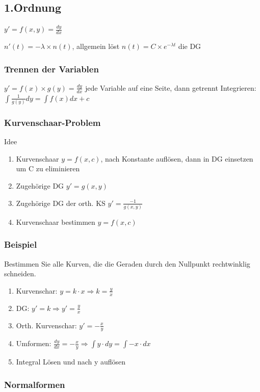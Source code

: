 \subsection*{1.Ordnung}

$y'=f(x,y)=\frac{dy}{dx}$

$n'(t)=-\lambda\times n(t)$, allgemein löst $n(t)=C\times e^{-\lambda t}$
die DG


\subsubsection*{Trennen der Variablen}

$y'=f(x)\times g(y)=\frac{dy}{dx}$ jede Variable auf eine Seite,
dann getrennt Integrieren: $\int\frac{1}{g(y)}dy=\int f(x)dx+c$ 


\subsubsection*{Kurvenschaar-Problem}

Idee
\begin{enumerate}
\item Kurvenschaar $y=f(x,c)$, nach Konstante auflösen, dann in DG einsetzen
um C zu eliminieren
\item Zugehörige DG $y'=g(x,y)$
\item Zugehörige DG der orth. KS $y'=\frac{-1}{g(x,y)}$
\item Kurvenschaar bestimmen $y=f(x,c)$ 
\end{enumerate}

\subsubsection*{Beispiel}

Bestimmen Sie alle Kurven, die die Geraden durch den Nullpunkt rechtwinklig
schneiden.
\begin{enumerate}
\item Kurvenschar: $y=k\cdot x\Rightarrow k=\frac{y}{x}$
\item DG: $y'=k\Rightarrow y'=\frac{y}{x}$
\item Orth. Kurvenschar: $y'=-\frac{x}{y}$
\item Umformen: $\frac{dy}{dx}=-\frac{x}{y}\Rightarrow\int y\cdot dy=\int-x\cdot dx$
\item Integral Lösen und nach y auflösen
\end{enumerate}

\subsubsection*{Normalformen}

